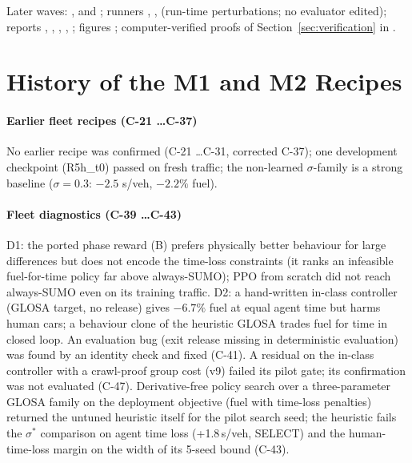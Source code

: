 {\sloppy\noindent Later waves: ,  and
; runners , ,  (run-time
perturbations; no evaluator edited); reports , , ,
, ; figures ; computer-verified proofs of Section~\ref{sec:verification} in .\par}


\section{History of the M1 and M2 Recipes}\label{app:history}
\paragraph{Earlier fleet recipes (C-21 \dots C-37)} No earlier recipe was confirmed (C-21 \dots C-31, corrected C-37); one development checkpoint (R5h\_t0)
passed on fresh traffic; the non-learned $\sigma$-family is a strong baseline ($\sigma=0.3$: $-2.5$ s/veh, $-2.2\%$ fuel).
\paragraph{Fleet diagnostics (C-39 \dots C-43)} D1: the ported phase reward (B) prefers physically better behaviour for large
differences but does not encode the time-loss constraints (it ranks an infeasible fuel-for-time policy far above always-SUMO); PPO from
scratch did not reach always-SUMO even on its training traffic. D2: a hand-written in-class controller (GLOSA target, no release) gives
$-6.7\%$ fuel at equal agent time but harms human cars; a behaviour clone of the heuristic GLOSA trades fuel for time in closed loop.
An evaluation bug (exit release missing in deterministic evaluation) was found by an identity check and fixed (C-41).
A residual on the in-class controller with a crawl-proof group cost (v9) failed its pilot gate; its confirmation was not evaluated (C-47).
Derivative-free policy search over a three-parameter GLOSA family on the deployment objective (fuel with time-loss penalties) returned
the untuned heuristic itself for the pilot search seed; the heuristic fails the $\sigma^*$ comparison on agent time loss (+1.8\,s/veh,
SELECT) and the human-time-loss margin on the width of its 5-seed bound (C-43).
